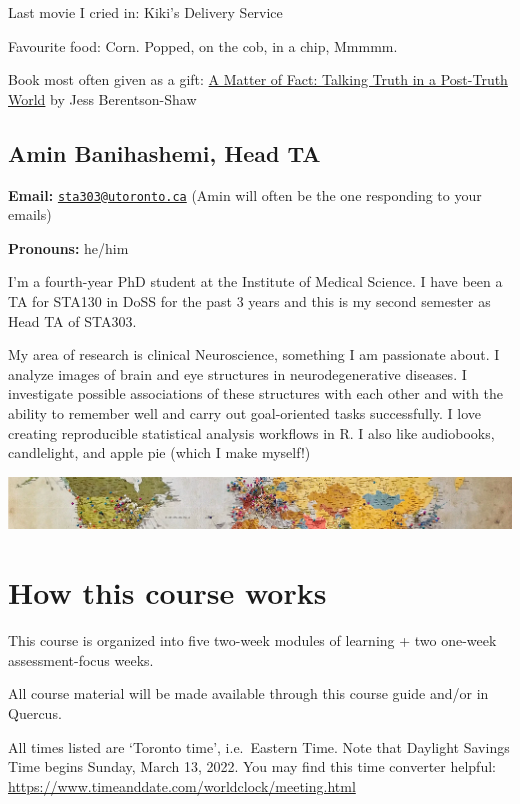 \documentclass[
  openany]{book}
\begin{document}
Last movie I cried in: Kiki's Delivery Service

Favourite food: Corn. Popped, on the cob, in a chip, Mmmmm.

Book most often given as a gift: \href{https://www.goodreads.com/book/show/41123067-a-matter-of-fact}{A Matter of Fact: Talking Truth in a Post-Truth World} by Jess Berentson-Shaw

\hypertarget{amin-banihashemi-head-ta}{%
\subsection{Amin Banihashemi, Head TA}\label{amin-banihashemi-head-ta}}

\textbf{Email:} \href{mailto:sta303@utoronto.ca}{\nolinkurl{sta303@utoronto.ca}} (Amin will often be the one responding to your emails)

\textbf{Pronouns:} he/him

I'm a fourth-year PhD student at the Institute of Medical Science. I have been a TA for STA130 in DoSS for the past 3 years and this is my second semester as Head TA of STA303.

My area of research is clinical Neuroscience, something I am passionate about. I analyze images of brain and eye structures in neurodegenerative diseases. I investigate possible associations of these structures with each other and with the ability to remember well and carry out goal-oriented tasks successfully. I love creating reproducible statistical analysis workflows in R. I also like audiobooks, candlelight, and apple pie (which I make myself!)

\includegraphics[width=1\linewidth]{images/headers/map}

\hypertarget{howthiscourseworks}{%
\section{How this course works}\label{howthiscourseworks}}

This course is organized into five two-week modules of learning + two one-week assessment-focus weeks.

All course material will be made available through this course guide and/or in Quercus.

All times listed are `Toronto time', i.e.~Eastern Time. Note that Daylight Savings Time begins Sunday, March 13, 2022. You may find this time converter helpful: \url{https://www.timeanddate.com/worldclock/meeting.html}
\end{document}
